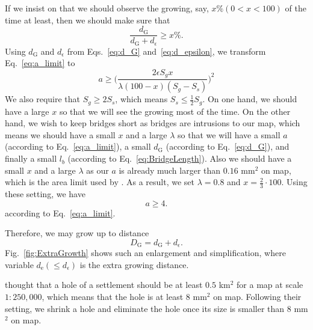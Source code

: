 \documentclass[graybox]{svmult}
\begin{document}
If we insist on that we should observe 
the growing, say, $x \% (0<x<100)$ of the time at least, then we should make 
sure that
\begin{equation}
\label{eq:a_limit}
\frac{d_\mathrm{G}}{d_\mathrm{G}+d_\epsilon} \ge x \%.
\end{equation}
Using $d_\mathrm{G}$ and $d_\epsilon$ from Eqs.~\ref{eq:d_G} 
and~\ref{eq:d_epsilon}, we transform Eq.~\ref{eq:a_limit} to
\begin{equation}
a \ge \Big(\frac{2 \epsilon S_g x}{\lambda (100-x) (S_g-S_s)}\Big)^2
\end{equation}
We also require 
that $S_g \ge 2 S_s$, which means $S_s \le \frac{1}{2} S_g$.
On one hand, we should have a large $x$ so that we will see the 
growing most of the time.
On the other hand, we wish to keep bridges short as bridges are intrusions to 
our map, which means we should have a small $x$ and a large $\lambda$ so that 
we will have a small 
$a$ (according to Eq.~\ref{eq:a_limit}), a small $d_\mathrm{G}$ (according to 
Eq.~\ref{eq:d_G}), and finally a small $l_b$ (according to 
Eq.~\ref{eq:BridgeLength}). Also we should have a small $x$ and a large 
$\lambda$ as our $a$ is already much larger than $0.16$ mm$^2$ on 
map, which is the area limit used by \textcite{Stoter2009}. As a result, we 
set 
$\lambda=0.8$ and $x=\frac{2}{3} \cdot 100$.
Using these setting, we have
\begin{equation}
a \ge 4.
\end{equation}
according to Eq.~\ref{eq:a_limit}.




Therefore, we may grow up to distance 
\[
D_\mathrm{G} = d_\mathrm{G} + d_\epsilon.
\]
Fig.~\ref{fig:ExtraGrowth} shows such an enlargement and simplification, 
where  
variable $d_\mathrm{e} (\le d_\epsilon)$ is the extra growing distance.


\textcite{Chaudhry2008} thought that a hole of a settlement should be at least 
$0.5$ km$^2$ for a map at scale $1:250{,}000$, which means that the hole is at 
least $8$ mm$^2$ on map. Following their setting, we shrink a hole and 
eliminate the hole once its size is smaller than $8$ mm$^2$ on map.
\end{document}
